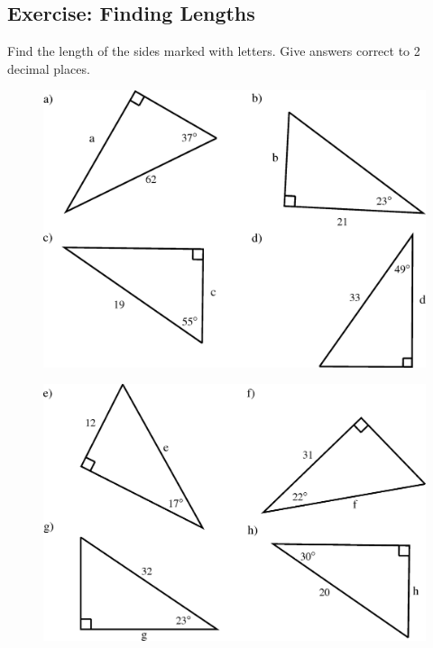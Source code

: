             \subsection{Exercise: Finding Lengths }
            \nopagebreak
            \label{m39408*id81582}Find the length of the sides marked with letters. Give answers correct to 2 decimal places.
    \setcounter{subfigure}{0}
	\begin{figure}[H] %
    \begin{center}
    \label{m39408*id81592!!!underscore!!!media}\label{m39408*id81592!!!underscore!!!printimage}\includegraphics{col11306.imgs/m39408_MG10C15_010.png} %
      \vspace{2pt}
    \vspace{.1in}
    \end{center}
 \end{figure}       
    \setcounter{subfigure}{0}
	\begin{figure}[H] %
    \begin{center}
    \label{m39408*id816001!!!underscore!!!media}\label{m39408*id816001!!!underscore!!!printimage}\includegraphics{col11306.imgs/m39408_MG10C15_011.png} %
      \vspace{2pt}
    \vspace{.1in}
    \end{center}
 \end{figure}       
